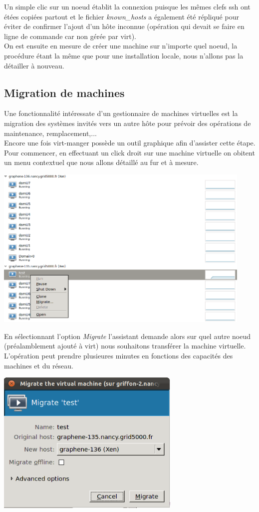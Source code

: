 Un simple clic sur un noeud établit la connexion puisque les mêmes clefs ssh ont étées copiées partout et le fichier \emph{known\_hosts} a également été répliqué pour éviter de confirmer l'ajout d'un hôte inconnue (opération qui devait se faire en ligne de commande car non gérée par virt).
\\
On est ensuite en mesure de créer une machine sur n'importe quel noeud, la procédure étant la même que pour une installation locale, nous n'allons pas la détailler à nouveau.

\subsection{Migration de machines}
Une fonctionnalité intéressate d'un gestionnaire de machines virtuelles est la migration des systèmes invités vers un autre hôte pour prévoir des opérations de maintenance, remplacement,...\\
Encore une fois virt-manger possède un outil graphique afin d'assister cette étape. Pour commencer, en effectuant un click droit sur une machine virtuelle on obitent un menu contextuel que nous allons détaillé au fur et à mesure.
\begin{center}
  \includegraphics[width=350pt]{images/virt-menu-context.png}
\end{center}
En sélectionnant l'option \emph{Migrate} l'assistant demande alors sur quel autre noeud (préalamblement ajouté à virt) nous souhaitons transférer la machine virtuelle. L'opération peut prendre plusieures minutes en fonctions des capacités des machines et du réseau.
\begin{center}
  \includegraphics[width=250pt]{images/migration1.png}
\end{center}

